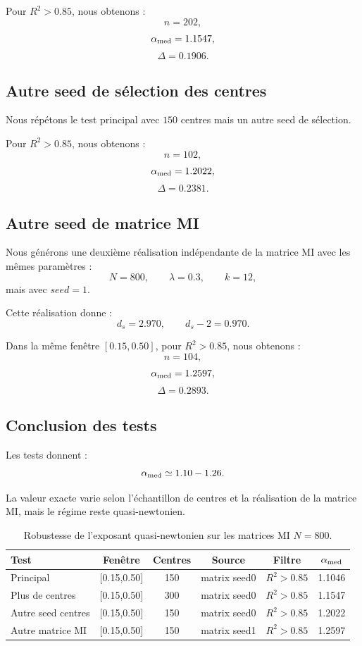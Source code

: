 \documentclass[11pt,a4paper]{article}
\begin{document}
Pour \(R^2>0.85\), nous obtenons :
\[
n=202,
\]
\[
\alpha_{\rm med}=1.1547,
\]
\[
\Delta=0.1906.
\]

\subsection{Autre seed de sélection des centres}

Nous répétons le test principal avec \(150\) centres mais un autre seed de
sélection.

Pour \(R^2>0.85\), nous obtenons :
\[
n=102,
\]
\[
\alpha_{\rm med}=1.2022,
\]
\[
\Delta=0.2381.
\]

\subsection{Autre seed de matrice MI}

Nous générons une deuxième réalisation indépendante de la matrice MI avec les
mêmes paramètres :
\[
N=800,
\qquad
\lambda=0.3,
\qquad
k=12,
\]
mais avec \(seed=1\).

Cette réalisation donne :
\[
d_s=2.970,
\qquad
d_s-2=0.970.
\]

Dans la même fenêtre \([0.15,0.50]\), pour \(R^2>0.85\), nous obtenons :
\[
n=104,
\]
\[
\alpha_{\rm med}=1.2597,
\]
\[
\Delta=0.2893.
\]

\subsection{Conclusion des tests}

Les tests donnent :
\[
\alpha_{\rm med}
\simeq
1.10-1.26.
\]

La valeur exacte varie selon l'échantillon de centres et la réalisation de la
matrice MI, mais le régime reste quasi-newtonien.

\begin{table}[h]
\centering
\begin{tabular}{lccccc}
\toprule
Test & Fenêtre & Centres & Source & Filtre & \(\alpha_{\rm med}\) \\
\midrule
Principal & [0.15,0.50] & 150 & matrix seed0 & \(R^2>0.85\) & 1.1046 \\
Plus de centres & [0.15,0.50] & 300 & matrix seed0 & \(R^2>0.85\) & 1.1547 \\
Autre seed centres & [0.15,0.50] & 150 & matrix seed0 & \(R^2>0.85\) & 1.2022 \\
Autre matrice MI & [0.15,0.50] & 150 & matrix seed1 & \(R^2>0.85\) & 1.2597 \\
\bottomrule
\end{tabular}
\caption{Robustesse de l'exposant quasi-newtonien sur les matrices MI \(N=800\).}
\end{table}
\end{document}
